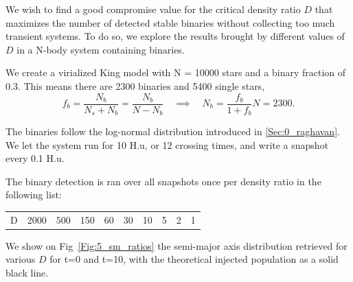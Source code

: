 We wish to find a good compromise value for the critical density ratio $D$ that maximizes the number of detected stable binaries without collecting too much transient systems. To do so, we explore the results brought by different values of $D$ in a N-body system containing binaries.

We create a virialized King model with N = 10000 stars and a binary fraction of 0.3. This means there are 2300 binaries and 5400 single stars,
\begin{equation}
f_b = \frac{N_b}{N_s + N_b} = \frac{N_b}{N-N_b} \quad \implies \quad N_b = \frac{f_b}{1+f_b} N = 2300.
\end{equation}

The binaries follow the \cite{Raghavan2010} log-normal distribution introduced in \ref{Sec:0_raghavan}. We let the system run for 10 H.u, or 12 crossing times, and write a snapshot every 0.1 H.u.

The binary detection is ran over all snapshots once per density ratio in the following list:

\begin{center}
\begin{tabular}{l|rrrrrrrrr}
\centering
D  &  2000 & 500 & 150 & 60 & 30 & 10 & 5 & 2 & 1\\ 
\end{tabular}
\end{center}

We show on Fig~\ref{Fig:5_sm_ratios} the semi-major axis distribution retrieved for various $D$ for t=0 and t=10, with the theoretical injected population as a solid black line.



